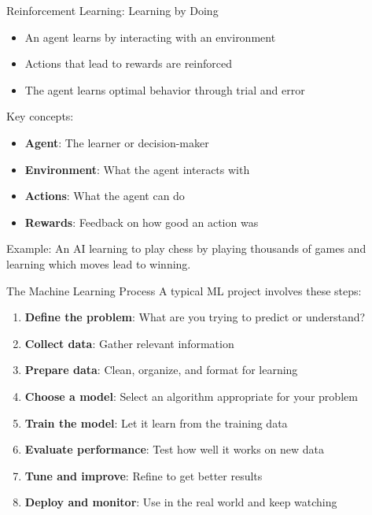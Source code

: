 \documentclass{beamer}
\begin{document}
\begin{frame}{Reinforcement Learning: Learning by Doing}
  \begin{itemize}
    \item An agent learns by interacting with an environment
    \item Actions that lead to rewards are reinforced
    \item The agent learns optimal behavior through trial and error
  \end{itemize}
  
  \vspace{0.3cm}
  Key concepts:
  \begin{itemize}
    \item \textbf{Agent}: The learner or decision-maker
    \item \textbf{Environment}: What the agent interacts with
    \item \textbf{Actions}: What the agent can do
    \item \textbf{Rewards}: Feedback on how good an action was
  \end{itemize}
  
  \vspace{0.3cm}
  Example: An AI learning to play chess by playing thousands of games and learning which moves lead to winning.
\end{frame}

\begin{frame}{The Machine Learning Process}
  A typical ML project involves these steps:
  
  \begin{enumerate}
    \item \textbf{Define the problem}: What are you trying to predict or understand?
    \item \textbf{Collect data}: Gather relevant information
    \item \textbf{Prepare data}: Clean, organize, and format for learning
    \item \textbf{Choose a model}: Select an algorithm appropriate for your problem
    \item \textbf{Train the model}: Let it learn from the training data
    \item \textbf{Evaluate performance}: Test how well it works on new data
    \item \textbf{Tune and improve}: Refine to get better results
    \item \textbf{Deploy and monitor}: Use in the real world and keep watching
  \end{enumerate}
\end{frame}
\end{document}
